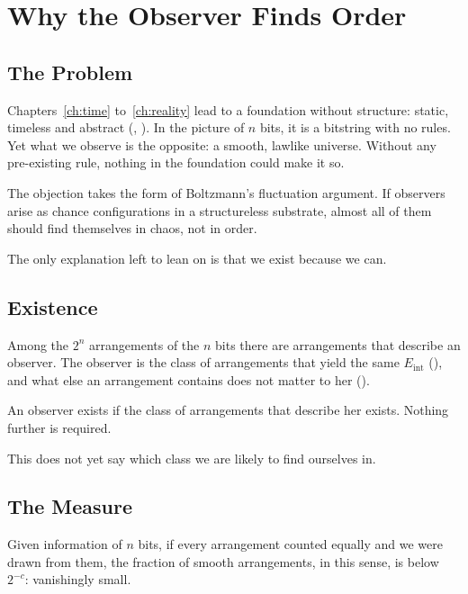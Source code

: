 \documentclass[11pt]{book}
\begin{document}
\chapter{Why the Observer Finds Order}
\label{ch:measure}

\section{The Problem}
\label{sec:problem}

Chapters~\ref{ch:time} to~\ref{ch:reality} lead to a foundation without
structure: static, timeless and abstract (,
). In the picture of $n$ bits, it is a bitstring with no
rules. Yet what we observe is the opposite: a smooth, lawlike universe.
Without any pre-existing rule, nothing in the foundation could make it so.

The objection takes the form of Boltzmann's fluctuation argument. If
observers arise as chance configurations in a structureless substrate,
almost all of them should find themselves in chaos, not in order.

The only explanation left to lean on is that we exist because we can.


\section{Existence}
\label{sec:existence}

Among the $2^n$ arrangements of the $n$ bits there are arrangements that
describe an observer. The observer is the class of arrangements that yield
the same $E_{\mathrm{int}}$ (), and what else an
arrangement contains does not matter to her ().

\begin{deduction}[Existence]\label{ded:existence}
  An observer exists if the class of arrangements that describe her
  exists. Nothing further is required.
\end{deduction}

This does not yet say which class we are likely to find ourselves in.


\section{The Measure}
\label{sec:measure}

Given information of $n$ bits, if every arrangement counted equally and we were drawn from them,
the fraction of smooth arrangements, in this sense, is below $2^{-c}$: vanishingly small.
\end{document}

